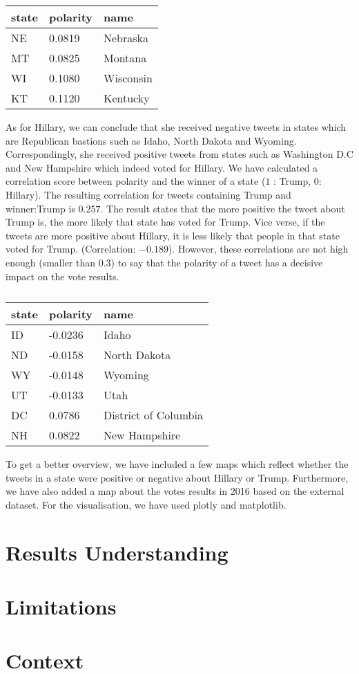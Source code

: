 \documentclass{article}
\begin{document}
  \begin{table}[H]
    \centering
    \begin{tabular}{||p{2cm} p{3cm} p{3cm} ||}
      \hline
      state & polarity & name \\ \hline
      NE & 0.0819 & Nebraska \\
      MT & 0.0825 & Montana \\
      WI & 0.1080 & Wisconsin \\
      KT & 0.1120 & Kentucky \\
      \hline
    \end{tabular}
    \caption{\label{tab:} }
  \end{table}

  As for Hillary, we can conclude that she received negative tweets in
  states which are Republican bastions such as Idaho, North Dakota and
  Wyoming. Correspondingly, she received positive tweets from states
  such as Washington D.C and New Hampshire which indeed voted for
  Hillary. We have calculated a correlation score between polarity and
  the winner of a state ($1$ : Trump, $0$: Hillary). The resulting
  correlation for tweets containing Trump and winner:Trump  is
  $0.257$. The result states that the more positive the tweet about
  Trump is, the more likely that state has voted for Trump. Vice
  verse, if the tweets are more positive about Hillary, it is less
  likely that people in that state voted for Trump. (Correlation:
  $-0.189$). However, these correlations are not high enough (smaller
  than $0.3$) to say that the polarity of a tweet has a decisive impact
  on the vote results.

  \begin{table}[H]
    \centering
    \begin{tabular}{||p{2cm} p{3cm} p{3cm} ||}
      \hline
      state & polarity & name \\ \hline
      ID & -0.0236 & Idaho \\
      ND & -0.0158 & North Dakota \\
      WY & -0.0148 & Wyoming \\
      UT & -0.0133 & Utah \\
      DC & 0.0786 & District of Columbia \\
      NH & 0.0822 & New Hampshire\\
      \hline
    \end{tabular}
    \caption{\label{tab:} }
  \end{table}

  To get a better overview, we have included a few maps which reflect
  whether the tweets in a state were positive or negative about
  Hillary or Trump. Furthermore, we have also added a map about the
  votes results in 2016 based on the external dataset. For the
  visualisation, we have used plotly and matplotlib.  
  
  \section{Results Understanding}
  \section{Limitations}
  \section{Context}
\end{document}
